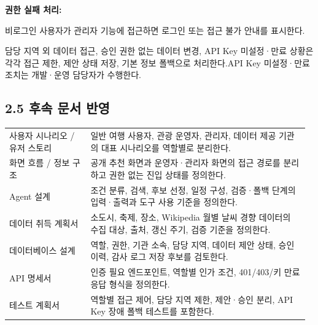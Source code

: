 \documentclass[12pt,a4paper]{article}
\newcommand{\DocNeedspace}[1]{\par\ifdim\dimexpr\pagegoal-\pagetotal\relax<#1\newpage\fi}
\renewcommand{\arraystretch}{1.35}
\begin{document}
\DocNeedspace{3\baselineskip}
\textbf{권한 실패 처리:}


\DocNeedspace{3\baselineskip}
비로그인 사용자가 관리자 기능에 접근하면 로그인 또는 접근 불가 안내를 표시한다.


\DocNeedspace{3\baselineskip}
담당 지역 외 데이터 접근, 승인 권한 없는 데이터 변경, API Key 미설정·만료 상황은 각각 접근 제한, 제안 상태 저장, 기본 정보 폴백으로 처리한다.\newline API Key 미설정·만료 조치는 개발·운영 담당자가 수행한다.


\DocNeedspace{24\baselineskip}
\subsection*{2.5 후속 문서 반영}


\DocNeedspace{20\baselineskip}
\begin{small}
\setlength{\tabcolsep}{3pt}
\setlength{\extrarowheight}{1pt}
\renewcommand{\arraystretch}{1.42}
\begin{longtable}{@{}>{\RaggedRight\arraybackslash}m{0.264\linewidth}>{\RaggedRight\arraybackslash}m{0.708\linewidth}@{}}
\toprule
\multicolumn{1}{>{\centering\arraybackslash}m{0.264\linewidth}}{\textbf{후속 문서}} & \multicolumn{1}{>{\centering\arraybackslash}m{0.708\linewidth}}{\textbf{반영 항목}} \\
\midrule
\endhead
사용자 시나리오 / 유저 스토리 & 일반 여행 사용자, 관광 운영자, 관리자, 데이터 제공 기관의 대표 시나리오를 역할별로 분리한다. \\
화면 흐름 / 정보 구조 & 공개 추천 화면과 운영자·관리자 화면의 접근 경로를 분리하고 권한 없는 진입 상태를 정의한다. \\
Agent 설계 & 조건 분류, 검색, 후보 선정, 일정 구성, 검증·폴백 단계의 입력·출력과 도구 사용 기준을 정의한다. \\
데이터 취득 계획서 & 소도시, 축제, 장소, Wikipedia 월별 날씨 경향 데이터의 수집 대상, 출처, 갱신 주기, 검증 기준을 정의한다. \\
데이터베이스 설계 & 역할, 권한, 기관 소속, 담당 지역, 데이터 제안 상태, 승인 이력, 감사 로그 저장 후보를 검토한다. \\
API 명세서 & 인증 필요 엔드포인트, 역할별 인가 조건, 401/403/키 만료 응답 형식을 정의한다. \\
테스트 계획서 & 역할별 접근 제어, 담당 지역 제한, 제안·승인 분리, API Key 장애 폴백 테스트를 포함한다. \\
\bottomrule
\end{longtable}
\end{small}
\end{document}
